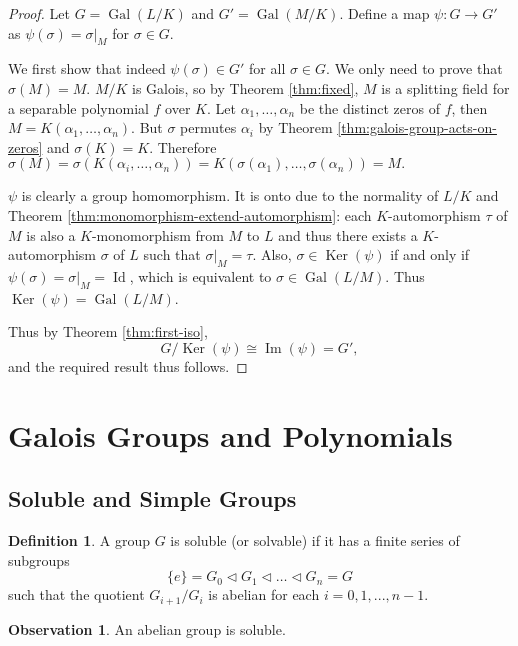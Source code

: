 \documentclass[12pt]{article}
\theoremstyle{definition}
\newtheorem{definition}[theorem]{Definition}
\newtheorem{observation}[theorem]{\textbf{Observation}}
\newcommand{\Gal}{\operatorname{Gal}}
\newcommand{\Id}{\operatorname{Id}}
\begin{document}
\begin{proof}
	Let $G = \Gal(L/K)$ and $G' = \Gal(M/K)$. Define a map $\psi: G \to G'$ as $\psi(\sigma) = \sigma | _M$ for $\sigma \in G$.
	
	We first show that indeed $\psi(\sigma) \in G'$ for all $\sigma \in G$. We only need to prove that $\sigma(M) = M$. $M/K$ is Galois, so by Theorem \ref{thm:fixed}, $M$ is a splitting field for a separable polynomial $f$ over $K$. Let $\alpha_1, \dots, \alpha_n$ be the distinct zeros of $f$, then $M = K(\alpha_1, \ldots, \alpha_n)$. But $\sigma$ permutes $\alpha_i$ by Theorem \ref{thm:galois-group-acts-on-zeros} and $\sigma(K) = K$. Therefore $\sigma(M) = \sigma(K(\alpha_i, \ldots, \alpha_n)) = K(\sigma(\alpha_1), \ldots, \sigma(\alpha_n)) = M. $
	
	
	 $\psi$ is clearly a group homomorphism. It is onto due to the normality of $L/K$ and Theorem \ref{thm:monomorphism-extend-automorphism}: each $K$-automorphism $\tau$ of $M$ is also a $K$-monomorphism from $M$ to $L$ and thus there exists a $K$-automorphism $\sigma$ of $L$ such that $\sigma | _M = \tau$. Also, $\sigma \in \operatorname{Ker}(\psi)$ if and only if $\psi(\sigma) = \sigma |_M = \Id$, which is equivalent to $\sigma \in \Gal(L/M)$. Thus $\operatorname{Ker}(\psi) = \Gal(L/M)$. 
	 
	 Thus by Theorem \ref{thm:first-iso}, 
	$$G / \operatorname{Ker}(\psi) \cong \operatorname{Im}(\psi) = G',$$
	and the required result thus follows. 
\end{proof}

\section{Galois Groups and Polynomials} \label{sec:galois-groups-and-polynomials}


\subsection{Soluble and Simple Groups}

\begin{definition} \label{def:soluble}
    A group $G$ is soluble (or solvable) if it has a finite series of subgroups 
    $$ \{ e \} = G_0 \triangleleft G_1 \triangleleft \dots \triangleleft G_n = G$$
    such that the quotient $G_{i+1} / G_{i}$ is abelian for each $i = 0, 1, ...,  n - 1$.
\end{definition}

\begin{observation}
    An abelian group is soluble. 
\end{observation}
\end{document}
